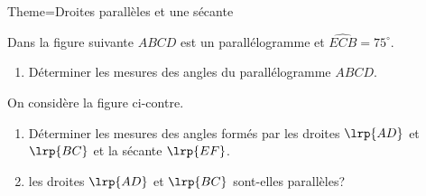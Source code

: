 \documentclass[a4paper,12pt]{article}
\begin{document}
\begin{Maquette}[Fiche]{Theme=Droites parallèles et une sécante}
\begin{exercice}
\begin{minipage}{0.6\linewidth}
Dans la figure suivante $ABCD$ est un parallélogramme et $\widehat{ECB}=75^{\circ}$.
\begin{enumerate}
\item Déterminer les mesures des angles du parallélogramme $ABCD$.
\end{enumerate}
\end{minipage}%
\begin{minipage}{0.4\linewidth}
\end{minipage}
\end{exercice}

\begin{exercice}
\begin{minipage}{0.6\linewidth}
On considère la figure ci-contre.
\begin{enumerate}
\item Déterminer les mesures des angles formés par les droites $\lrp{AD}$ et $\lrp{BC}$ et la sécante $\lrp{EF}$.
\item les droites $\lrp{AD}$ et $\lrp{BC}$ sont-elles parallèles?
\end{enumerate}
\end{minipage}%
\begin{minipage}{0.4\linewidth}
\end{minipage}
\end{exercice}


\end{Maquette}
\end{document}

